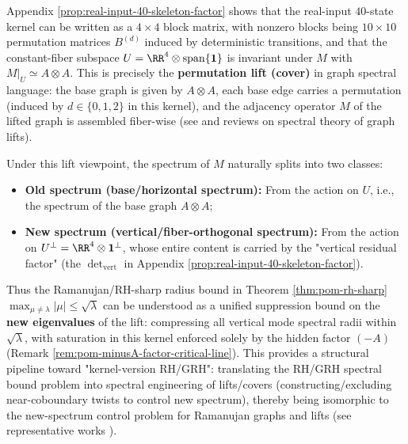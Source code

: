 \begin{remark}\label{rem:pom-permutation-lift-ramanujan}
Appendix \ref{prop:real-input-40-skeleton-factor} shows that the real-input \(40\)-state kernel can be written as a \(4\times 4\) block matrix, with nonzero blocks being \(10\times 10\) permutation matrices \(B^{(d)}\) induced by deterministic transitions, and that the constant-fiber subspace
\(
U=\RR^{4}\otimes \mathrm{span}\{\mathbf{1}\}
\)
is invariant under \(M\) with \(M|_{U}\simeq A\otimes A\).
This is precisely the \textbf{permutation lift (cover)} in graph spectral language: the base graph is given by \(A\otimes A\), each base edge carries a permutation (induced by \(d\in\{0,1,2\}\) in this kernel), and the adjacency operator \(M\) of the lifted graph is assembled fiber-wise (see \cite{StarkTerras1996GraphCoverings,TerrasZetaGraphs} and reviews on spectral theory of graph lifts).
\par
Under this lift viewpoint, the spectrum of \(M\) naturally splits into two classes:
\begin{itemize}
  \item \textbf{Old spectrum (base/horizontal spectrum):} From the action on \(U\), i.e., the spectrum of the base graph \(A\otimes A\);
  \item \textbf{New spectrum (vertical/fiber-orthogonal spectrum):} From the action on \(U^\perp=\RR^{4}\otimes \mathbf{1}^\perp\), whose entire content is carried by the "vertical residual factor" (the \(\det_{\mathrm{vert}}\) in Appendix \ref{prop:real-input-40-skeleton-factor}).
\end{itemize}
Thus the Ramanujan/RH-sharp radius bound in Theorem \ref{thm:pom-rh-sharp}
\(
\max_{\mu\neq\lambda}|\mu|\le \sqrt{\lambda}
\)
can be understood as a unified suppression bound on the \textbf{new eigenvalues} of the lift: compressing all vertical mode spectral radii within \(\sqrt{\lambda}\), with saturation in this kernel enforced solely by the hidden factor \((-A)\) (Remark \ref{rem:pom-minusA-factor-critical-line}).
This provides a structural pipeline toward "kernel-version RH/GRH": translating the RH/GRH spectral bound problem into spectral engineering of lifts/covers (constructing/excluding near-coboundary twists to control new spectrum), thereby being isomorphic to the new-spectrum control problem for Ramanujan graphs and lifts (see representative works \cite{BiluLinial2006LiftsDiscrepancy,Friedman2008AlonSecondEigenvalue,LinialPuder2010WordMapsLifts}).
\end{remark}

